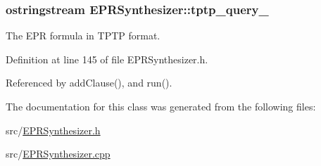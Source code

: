 \hypertarget{classEPRSynthesizer_a5b9074e1ca3d1a12150c6ae639f475fa}{
\subsubsection[{tptp\-\_\-query\-\_\-}]{\setlength{\rightskip}{0pt plus 5cm}ostringstream E\-P\-R\-Synthesizer\-::tptp\-\_\-query\-\_\-\hspace{0.3cm}{\ttfamily [protected]}}}\label{classEPRSynthesizer_a5b9074e1ca3d1a12150c6ae639f475fa}


The E\-P\-R formula in T\-P\-T\-P format. 



Definition at line 145 of file E\-P\-R\-Synthesizer.\-h.



Referenced by add\-Clause(), and run().



The documentation for this class was generated from the following files\-:\begin{DoxyCompactItemize}
\item 
src/\hyperlink{EPRSynthesizer_8h}{E\-P\-R\-Synthesizer.\-h}\item 
src/\hyperlink{EPRSynthesizer_8cpp}{E\-P\-R\-Synthesizer.\-cpp}\end{DoxyCompactItemize}
